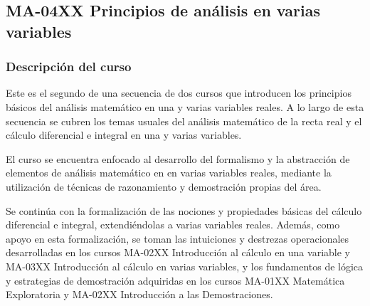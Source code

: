 \newpage
\subsection*{MA-04XX Principios de análisis en varias variables}

\begin{refsection}
\begin{table}[H]
\end{table}



\subsubsection*{Descripción del curso}



Este es el segundo de una secuencia de dos cursos que introducen los principios básicos del análisis matemático en una y varias variables reales. A lo largo de esta secuencia se cubren los temas usuales del análisis matemático
de la recta real y el cálculo diferencial e integral en una y varias variables. 

El curso se encuentra enfocado al desarrollo del formalismo y la abstracción de elementos de análisis matemático en en varias variables reales, mediante la utilización de técnicas de razonamiento y demostración propias del área.

Se continúa con la formalización de las nociones y propiedades básicas del cálculo diferencial e integral, extendiéndolas a varias variables reales. Además, como apoyo en esta formalización, se toman las intuiciones y destrezas operacionales desarrolladas en los cursos MA-02XX Introducción al cálculo en una variable y MA-03XX Introducción al cálculo en varias variables, y los fundamentos de lógica y estrategias de demostración adquiridas en los cursos MA-01XX Matemática Exploratoria y MA-02XX Introducción a las Demostraciones.






\end{refsection}
